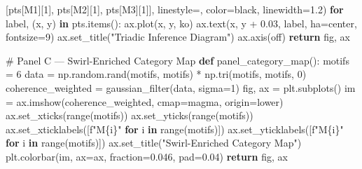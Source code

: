 \documentclass[
  11pt,
]{article}
\newenvironment{Shaded}{\begin{snugshade}}{\end{snugshade}}
\newcommand{\BuiltInTok}[1]{\textcolor[rgb]{0.00,0.23,0.31}{#1}}
\newcommand{\CommentTok}[1]{\textcolor[rgb]{0.37,0.37,0.37}{#1}}
\newcommand{\ControlFlowTok}[1]{\textcolor[rgb]{0.00,0.23,0.31}{\textbf{#1}}}
\newcommand{\DecValTok}[1]{\textcolor[rgb]{0.68,0.00,0.00}{#1}}
\newcommand{\FloatTok}[1]{\textcolor[rgb]{0.68,0.00,0.00}{#1}}
\newcommand{\KeywordTok}[1]{\textcolor[rgb]{0.00,0.23,0.31}{\textbf{#1}}}
\newcommand{\NormalTok}[1]{\textcolor[rgb]{0.00,0.23,0.31}{#1}}
\newcommand{\OperatorTok}[1]{\textcolor[rgb]{0.37,0.37,0.37}{#1}}
\newcommand{\SpecialCharTok}[1]{\textcolor[rgb]{0.37,0.37,0.37}{#1}}
\newcommand{\SpecialStringTok}[1]{\textcolor[rgb]{0.13,0.47,0.30}{#1}}
\newcommand{\StringTok}[1]{\textcolor[rgb]{0.13,0.47,0.30}{#1}}
\begin{document}
\begin{Shaded}
\begin{Highlighting}[]
\NormalTok{            [pts[}\StringTok{\textquotesingle{}M1\textquotesingle{}}\NormalTok{][}\DecValTok{1}\NormalTok{], pts[}\StringTok{\textquotesingle{}M2\textquotesingle{}}\NormalTok{][}\DecValTok{1}\NormalTok{], pts[}\StringTok{\textquotesingle{}M3\textquotesingle{}}\NormalTok{][}\DecValTok{1}\NormalTok{]],}
\NormalTok{            linestyle}\OperatorTok{=}\StringTok{\textquotesingle{}{-}{-}\textquotesingle{}}\NormalTok{, color}\OperatorTok{=}\StringTok{\textquotesingle{}black\textquotesingle{}}\NormalTok{, linewidth}\OperatorTok{=}\FloatTok{1.2}\NormalTok{)}
    \ControlFlowTok{for}\NormalTok{ label, (x, y) }\KeywordTok{in}\NormalTok{ pts.items():}
\NormalTok{        ax.plot(x, y, }\StringTok{\textquotesingle{}ko\textquotesingle{}}\NormalTok{)}
\NormalTok{        ax.text(x, y }\OperatorTok{+} \FloatTok{0.03}\NormalTok{, label, ha}\OperatorTok{=}\StringTok{\textquotesingle{}center\textquotesingle{}}\NormalTok{, fontsize}\OperatorTok{=}\DecValTok{9}\NormalTok{)}
\NormalTok{    ax.set\_title(}\StringTok{"Triadic Inference Diagram"}\NormalTok{)}
\NormalTok{    ax.axis(}\StringTok{\textquotesingle{}off\textquotesingle{}}\NormalTok{)}
    \ControlFlowTok{return}\NormalTok{ fig, ax}

\CommentTok{\# Panel C — Swirl{-}Enriched Category Map}
\KeywordTok{def}\NormalTok{ panel\_category\_map():}
\NormalTok{    motifs }\OperatorTok{=} \DecValTok{6}
\NormalTok{    data }\OperatorTok{=}\NormalTok{ np.random.rand(motifs, motifs) }\OperatorTok{*}\NormalTok{ np.tri(motifs, motifs, }\DecValTok{0}\NormalTok{)}
\NormalTok{    coherence\_weighted }\OperatorTok{=}\NormalTok{ gaussian\_filter(data, sigma}\OperatorTok{=}\DecValTok{1}\NormalTok{)}
\NormalTok{    fig, ax }\OperatorTok{=}\NormalTok{ plt.subplots()}
\NormalTok{    im }\OperatorTok{=}\NormalTok{ ax.imshow(coherence\_weighted, cmap}\OperatorTok{=}\StringTok{\textquotesingle{}magma\textquotesingle{}}\NormalTok{, origin}\OperatorTok{=}\StringTok{\textquotesingle{}lower\textquotesingle{}}\NormalTok{)}
\NormalTok{    ax.set\_xticks(}\BuiltInTok{range}\NormalTok{(motifs))}
\NormalTok{    ax.set\_yticks(}\BuiltInTok{range}\NormalTok{(motifs))}
\NormalTok{    ax.set\_xticklabels([}\SpecialStringTok{f"M}\SpecialCharTok{\{}\NormalTok{i}\SpecialCharTok{\}}\SpecialStringTok{"} \ControlFlowTok{for}\NormalTok{ i }\KeywordTok{in} \BuiltInTok{range}\NormalTok{(motifs)])}
\NormalTok{    ax.set\_yticklabels([}\SpecialStringTok{f"M}\SpecialCharTok{\{}\NormalTok{i}\SpecialCharTok{\}}\SpecialStringTok{"} \ControlFlowTok{for}\NormalTok{ i }\KeywordTok{in} \BuiltInTok{range}\NormalTok{(motifs)])}
\NormalTok{    ax.set\_title(}\StringTok{"Swirl{-}Enriched Category Map"}\NormalTok{)}
\NormalTok{    plt.colorbar(im, ax}\OperatorTok{=}\NormalTok{ax, fraction}\OperatorTok{=}\FloatTok{0.046}\NormalTok{, pad}\OperatorTok{=}\FloatTok{0.04}\NormalTok{)}
    \ControlFlowTok{return}\NormalTok{ fig, ax}


\end{Highlighting}
\end{Shaded}
\end{document}
